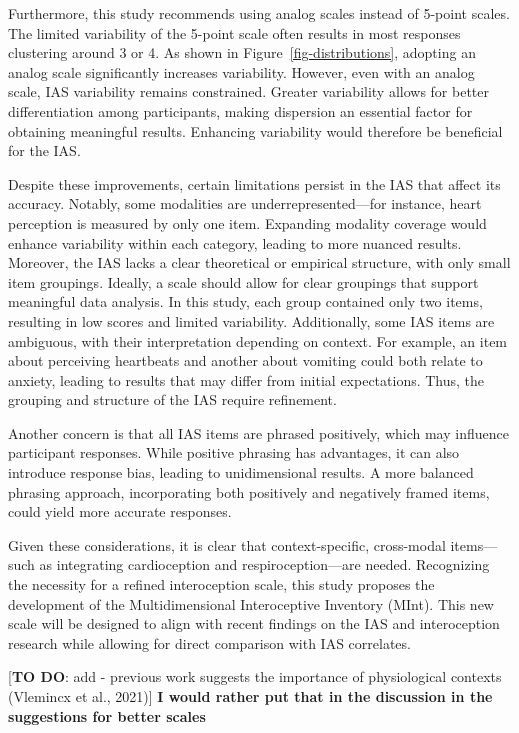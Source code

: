 \documentclass[
  man,
  floatsintext,
  longtable,
  nolmodern,
  notxfonts,
  notimes,
  colorlinks=true,linkcolor=blue,citecolor=blue,urlcolor=blue]{apa7}
\begin{document}
Furthermore, this study recommends using analog scales instead of
5-point scales. The limited variability of the 5-point scale often
results in most responses clustering around 3 or 4. As shown in
Figure~\ref{fig-distributions}, adopting an analog scale significantly
increases variability. However, even with an analog scale, IAS
variability remains constrained. Greater variability allows for better
differentiation among participants, making dispersion an essential
factor for obtaining meaningful results. Enhancing variability would
therefore be beneficial for the IAS.

Despite these improvements, certain limitations persist in the IAS that
affect its accuracy. Notably, some modalities are underrepresented---for
instance, heart perception is measured by only one item. Expanding
modality coverage would enhance variability within each category,
leading to more nuanced results. Moreover, the IAS lacks a clear
theoretical or empirical structure, with only small item groupings.
Ideally, a scale should allow for clear groupings that support
meaningful data analysis. In this study, each group contained only two
items, resulting in low scores and limited variability. Additionally,
some IAS items are ambiguous, with their interpretation depending on
context. For example, an item about perceiving heartbeats and another
about vomiting could both relate to anxiety, leading to results that may
differ from initial expectations. Thus, the grouping and structure of
the IAS require refinement.

Another concern is that all IAS items are phrased positively, which may
influence participant responses. While positive phrasing has advantages,
it can also introduce response bias, leading to unidimensional results.
A more balanced phrasing approach, incorporating both positively and
negatively framed items, could yield more accurate responses.

Given these considerations, it is clear that context-specific,
cross-modal items---such as integrating cardioception and
respiroception---are needed. Recognizing the necessity for a refined
interoception scale, this study proposes the development of the
Multidimensional Interoceptive Inventory (MInt). This new scale will be
designed to align with recent findings on the IAS and interoception
research while allowing for direct comparison with IAS correlates.

{[}\textbf{TO DO}: add - previous work suggests the importance of
physiological contexts (Vlemincx et al., 2021){]} \textbf{I would rather
put that in the discussion in the suggestions for better scales}
\end{document}
